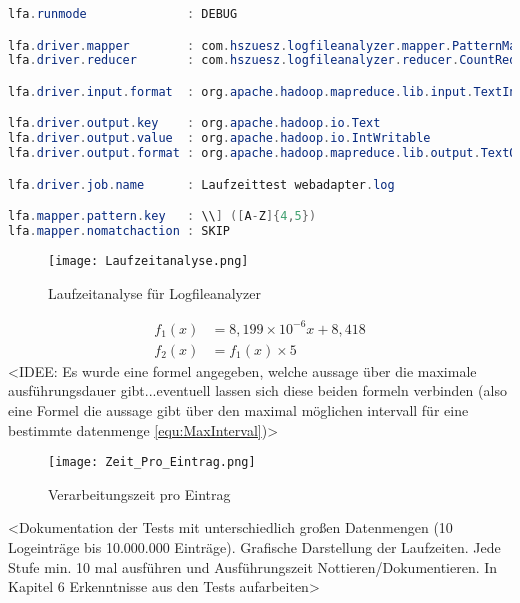 \begin{lstlisting}[language=Java,caption=Properties für Anwendungstest,label=lis:PropertiesAnwendungstest]
lfa.runmode              : DEBUG

lfa.driver.mapper        : com.hszuesz.logfileanalyzer.mapper.PatternMapper
lfa.driver.reducer       : com.hszuesz.logfileanalyzer.reducer.CountReducer

lfa.driver.input.format  : org.apache.hadoop.mapreduce.lib.input.TextInputFormat

lfa.driver.output.key    : org.apache.hadoop.io.Text
lfa.driver.output.value  : org.apache.hadoop.io.IntWritable
lfa.driver.output.format : org.apache.hadoop.mapreduce.lib.output.TextOutputFormat

lfa.driver.job.name      : Laufzeittest webadapter.log

lfa.mapper.pattern.key   : \\] ([A-Z]{4,5})
lfa.mapper.nomatchaction : SKIP
\end{lstlisting}

\begin{figure}
	\texttt{[image: Laufzeitanalyse.png]}
	\caption{Laufzeitanalyse für Logfileanalyzer}
	\label{fig:Laufzeitanalyse}
\end{figure}

\begin{align}
f_1(x) &= 8,199 \times 10^{-6} x + 8,418 \label{equ:Laufzeit} \\
f_2(x) &= f_1(x) \times 5 \label{equ:MaxInterval}
\end{align}
<IDEE: Es wurde eine formel angegeben, welche aussage über die maximale ausführungsdauer gibt...eventuell lassen sich diese beiden formeln verbinden (also eine Formel die aussage gibt über den maximal möglichen intervall für eine bestimmte datenmenge \autoref{equ:MaxInterval})>

\begin{figure}
	\texttt{[image: Zeit\_Pro\_Eintrag.png]}
	\caption{Verarbeitungszeit pro Eintrag}
	\label{fig:VerarbeitungszeitProEintrag}
\end{figure}

<Dokumentation der Tests mit unterschiedlich großen Datenmengen (10 Logeinträge bis 10.000.000 Einträge). Grafische Darstellung der Laufzeiten. Jede Stufe min. 10 mal ausführen und Ausführungszeit Nottieren/Dokumentieren. In Kapitel 6 Erkenntnisse aus den Tests aufarbeiten>